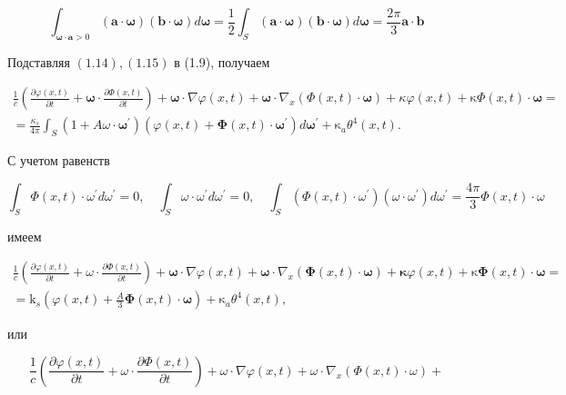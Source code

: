 \documentclass[10pt]{article}
\begin{document}
$$
\int_{\boldsymbol{\omega} \cdot \mathbf{a}>0}(\mathbf{a} \cdot \boldsymbol{\omega})(\mathbf{b} \cdot \boldsymbol{\omega}) d \boldsymbol{\omega}=\frac{1}{2} \int_{S}(\mathbf{a} \cdot \boldsymbol{\omega})(\mathbf{b} \cdot \boldsymbol{\omega}) d \boldsymbol{\omega}=\frac{2 \pi}{3} \mathbf{a} \cdot \mathbf{b}
$$

Подставляя $(1.14),(1.15)$ в (1.9), получаем

$$
\begin{gathered}
\frac{1}{c}\left(\frac{\partial \varphi(x, t)}{\partial t}+\boldsymbol{\omega} \cdot \frac{\partial \Phi(x, t)}{\partial t}\right)+\boldsymbol{\omega} \cdot \nabla \varphi(x, t)+\boldsymbol{\omega} \cdot \nabla_{x}(\Phi(x, t) \cdot \boldsymbol{\omega})+\kappa \varphi(x, t)+\mathrm{\kappa} \Phi(x, t) \cdot \boldsymbol{\omega}= \\
=\frac{\kappa_{s}}{4 \pi} \int_{S}\left(1+A \omega \cdot \boldsymbol{\omega}^{\prime}\right)\left(\varphi(x, t)+\boldsymbol{\Phi}(x, t) \cdot \boldsymbol{\omega}^{\prime}\right) d \boldsymbol{\omega}^{\prime}+\mathrm{\kappa}_{a} \theta^{4}(x, t) .
\end{gathered}
$$

С учетом равенств

$$
\int_{S} \Phi(x, t) \cdot \omega^{\prime} d \omega^{\prime}=0, \quad \int_{S} \omega \cdot \omega^{\prime} d \omega^{\prime}=0, \quad \int_{S}\left(\Phi(x, t) \cdot \omega^{\prime}\right)\left(\omega \cdot \omega^{\prime}\right) d \omega^{\prime}=\frac{4 \pi}{3} \Phi(x, t) \cdot \omega
$$

имеем

$$
\begin{gathered}
\frac{1}{c}\left(\frac{\partial \varphi(x, t)}{\partial t}+\omega \cdot \frac{\partial \Phi(x, t)}{\partial t}\right)+\boldsymbol{\omega} \cdot \nabla \varphi(x, t)+\boldsymbol{\omega} \cdot \nabla_{x}(\boldsymbol{\Phi}(x, t) \cdot \boldsymbol{\omega})+\boldsymbol{\kappa} \varphi(x, t)+\mathrm{\kappa} \boldsymbol{\Phi}(x, t) \cdot \boldsymbol{\omega}= \\
=\mathrm{k}_{s}\left(\varphi(x, t)+\frac{A}{3} \boldsymbol{\Phi}(x, t) \cdot \boldsymbol{\omega}\right)+\mathrm{\kappa}_{a} \theta^{4}(x, t),
\end{gathered}
$$

или

$$
\frac{1}{c}\left(\frac{\partial \varphi(x, t)}{\partial t}+\omega \cdot \frac{\partial \Phi(x, t)}{\partial t}\right)+\omega \cdot \nabla \varphi(x, t)+\omega \cdot \nabla_{x}(\Phi(x, t) \cdot \omega)+
$$
\end{document}
